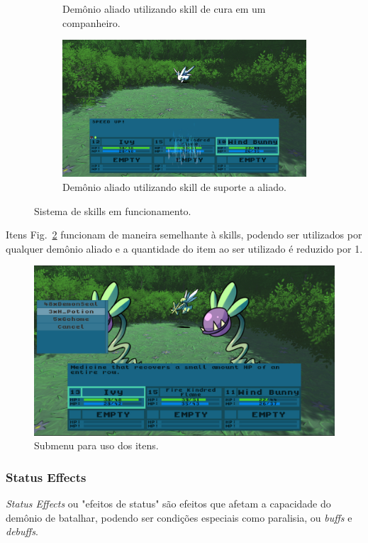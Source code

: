 \documentclass[
	12pt,				%
	openright,			%
	twoside,			%
	a4paper,			%
	english,			%
	french,				%
	spanish,			%
	brazil				%
	]{abntex2}
\begin{document}
\begin{figure}[h!]
\begin{subfigure}[b]{0.49\linewidth}
    \caption{Demônio aliado utilizando skill de cura em um companheiro.}
  \end{subfigure}
  \begin{subfigure}[b]{0.49\linewidth}
    \includegraphics[width=\linewidth]{support.jpg}
    \caption{Demônio aliado utilizando skill de suporte a aliado.}
  \end{subfigure}
  \caption{Sistema de skills em funcionamento.}
  \label{fig:battle2}
\end{figure}

Itens Fig.~\ref{fig:itens} funcionam de maneira semelhante à skills, podendo ser utilizados por qualquer demônio aliado e a quantidade do item ao ser utilizado é reduzido por 1.

\begin{figure}[h!]
 \centering
  \includegraphics[width=0.5\linewidth]{itemmenu.jpg}
  \caption{Submenu para uso dos itens.}
  \label{fig:itens}
\end{figure}

\subsubsection{Status Effects}

\emph{Status Effects} ou "efeitos de status" são efeitos que afetam a capacidade do demônio de batalhar, podendo ser condições especiais como paralisia, ou \emph{buffs} e \emph{debuffs}.
\end{document}
